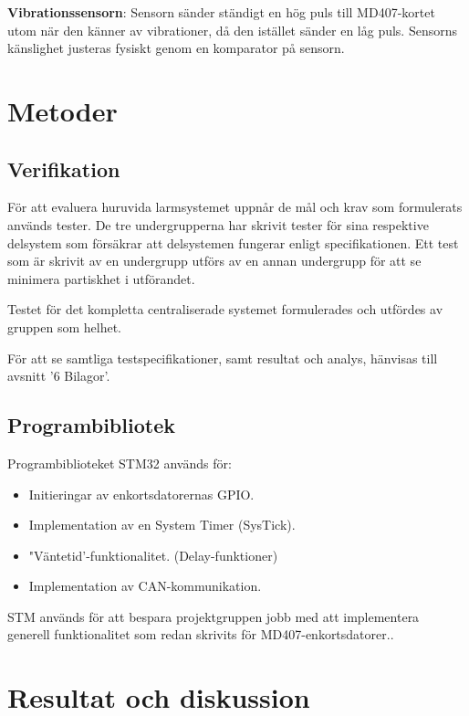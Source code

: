 \documentclass{article}
\begin{document}
\textbf{Vibrationssensorn}: Sensorn sänder ständigt en hög puls till MD407-kortet utom när den känner av vibrationer, då den istället sänder en låg puls. 
Sensorns känslighet justeras fysiskt genom en komparator på sensorn.




\section{Metoder}
\label{stm}
\subsection{Verifikation}
För att evaluera huruvida larmsystemet uppnår de mål och krav som formulerats används tester. 
De tre undergrupperna har skrivit tester för sina respektive delsystem som försäkrar att 
delsystemen fungerar enligt specifikationen. Ett test som är skrivit av en undergrupp utförs
av en annan undergrupp för att se minimera partiskhet i utförandet. 

Testet för det kompletta centraliserade systemet formulerades och utfördes av gruppen som helhet.

För att se samtliga testspecifikationer, samt resultat och analys, hänvisas till avsnitt '6 Bilagor'.


\subsection{Programbibliotek}
\label{stm}
Programbiblioteket STM32\cite{stm} används för:
\begin{itemize}
    \item Initieringar av enkortsdatorernas GPIO.
    \item Implementation av en System Timer (SysTick).
    \item "Väntetid'-funktionalitet. (Delay-funktioner)
    \item Implementation av CAN-kommunikation.
\end{itemize}

STM används för att bespara projektgruppen jobb med att implementera \\ generell funktionalitet
 som redan skrivits för MD407-enkortsdatorer.. 

\section{Resultat och diskussion} %
\end{document}
